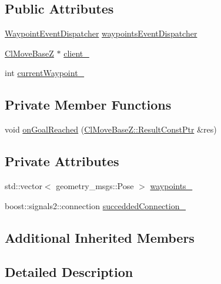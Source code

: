 \subsection*{Public Attributes}
\begin{DoxyCompactItemize}
\item 
\hyperlink{classcl__move__base__z_1_1WaypointEventDispatcher}{Waypoint\+Event\+Dispatcher} \hyperlink{classcl__move__base__z_1_1WaypointNavigator_a4f2be7a9741e8535c414e63335d752a0}{waypoints\+Event\+Dispatcher}
\item 
\hyperlink{classcl__move__base__z_1_1ClMoveBaseZ}{Cl\+Move\+BaseZ} $\ast$ \hyperlink{classcl__move__base__z_1_1WaypointNavigator_afc5ad5c5d15f41437286b8fca1d3a324}{client\+\_\+}
\item 
int \hyperlink{classcl__move__base__z_1_1WaypointNavigator_a82859e418592c2392c20a2d11b9836eb}{current\+Waypoint\+\_\+}
\end{DoxyCompactItemize}
\subsection*{Private Member Functions}
\begin{DoxyCompactItemize}
\item 
void \hyperlink{classcl__move__base__z_1_1WaypointNavigator_ae10ba80b7e46b62096cac96609f66893}{on\+Goal\+Reached} (\hyperlink{classcl__move__base__z_1_1ClMoveBaseZ_a99373d0c15ae96684462d8677f5fd632}{Cl\+Move\+Base\+Z\+::\+Result\+Const\+Ptr} \&res)
\end{DoxyCompactItemize}
\subsection*{Private Attributes}
\begin{DoxyCompactItemize}
\item 
std\+::vector$<$ geometry\+\_\+msgs\+::\+Pose $>$ \hyperlink{classcl__move__base__z_1_1WaypointNavigator_a727f6a73e15ff5dc6bb3ffdf52c3d832}{waypoints\+\_\+}
\item 
boost\+::signals2\+::connection \hyperlink{classcl__move__base__z_1_1WaypointNavigator_a6e32b1d6cae56963187d0965de251108}{succedded\+Connection\+\_\+}
\end{DoxyCompactItemize}
\subsection*{Additional Inherited Members}


\subsection{Detailed Description}


